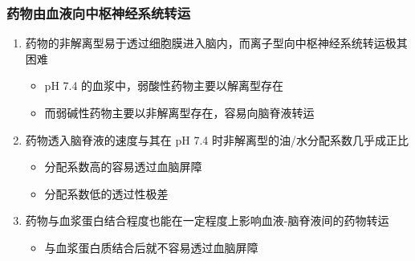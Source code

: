 \documentclass[dvipsnames, svgnames, x11names]{beamer}
\begin{document}
\begin{frame}
    \frametitle{药物由血液向中枢神经系统转运}
    \begin{enumerate}
      \item 药物的非解离型易于透过细胞膜进入脑内，而离子型向中枢神经系统转运极其困难
        \begin{itemize}
          \item pH 7.4 的血浆中，弱酸性药物主要以解离型存在
          \item 而弱碱性药物主要以非解离型存在，容易向脑脊液转运
        \end{itemize}
      \item 药物透入脑脊液的速度与其在 pH 7.4 时非解离型的油/水分配系数几乎成正比
        \begin{itemize}
            \item 分配系数高的容易透过血脑屏障
            \item 分配系数低的透过性极差
        \end{itemize}
      \item 药物与血浆蛋白结合程度也能在一定程度上影响血液-脑脊液间的药物转运
        \begin{itemize}
            \item 与血浆蛋白质结合后就不容易透过血脑屏障
        \end{itemize}
    \end{enumerate}
\end{frame}
\end{document}
